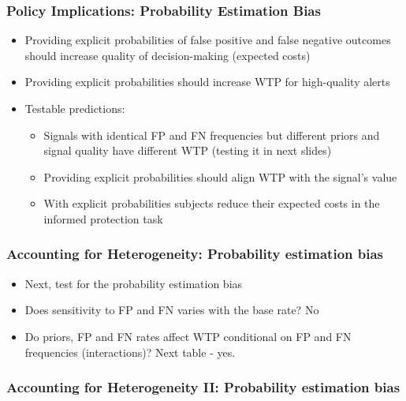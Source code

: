 \documentclass[11pt,hyperref={bookmarks=false}]{beamer}
\begin{document}
\begin{frame}
\frametitle{Policy Implications: Probability Estimation Bias}
\begin{itemize}
\item Providing explicit probabilities of false positive and false negative outcomes should increase quality of decision-making (expected costs)
\item Providing explicit probabilities should increase WTP for high-quality alerts
\item Testable predictions:
\begin{itemize}
\item Signals with identical FP and FN frequencies but different priors and signal quality have different WTP (testing it in next slides)
\item Providing explicit probabilities should align WTP with the signal's value
\item With explicit probabilities subjects reduce their expected costs in the informed protection task
\end{itemize}
\end{itemize}
\end{frame}

\begin{frame}
\frametitle{Accounting for Heterogeneity: Probability estimation bias}
\begin{itemize}
\item Next, test for the probability estimation bias
\item Does sensitivity to FP and FN varies with the base rate? No
\item Do priors, FP and FN rates affect WTP conditional on FP and FN frequencies (interactions)? Next table - yes.
\end{itemize}
\footnotesize

\end{frame}



\begin{frame}
\frametitle{Accounting for Heterogeneity II: Probability estimation bias}

\footnotesize

\end{frame}
\end{document}
